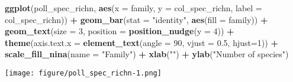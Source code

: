 \documentclass[]{article}
\newenvironment{Shaded}{\begin{snugshade}}{\end{snugshade}}
\newcommand{\DataTypeTok}[1]{\textcolor[rgb]{0.13,0.29,0.53}{#1}}
\newcommand{\DecValTok}[1]{\textcolor[rgb]{0.00,0.00,0.81}{#1}}
\newcommand{\FloatTok}[1]{\textcolor[rgb]{0.00,0.00,0.81}{#1}}
\newcommand{\KeywordTok}[1]{\textcolor[rgb]{0.13,0.29,0.53}{\textbf{#1}}}
\newcommand{\NormalTok}[1]{#1}
\newcommand{\OperatorTok}[1]{\textcolor[rgb]{0.81,0.36,0.00}{\textbf{#1}}}
\newcommand{\StringTok}[1]{\textcolor[rgb]{0.31,0.60,0.02}{#1}}
\begin{document}
\begin{Shaded}
\begin{Highlighting}[]
\KeywordTok{ggplot}\NormalTok{(poll_spec_richn, }\KeywordTok{aes}\NormalTok{(}\DataTypeTok{x =}\NormalTok{ family, }\DataTypeTok{y =}\NormalTok{ col_spec_richn, }\DataTypeTok{label =}\NormalTok{ col_spec_richn)) }\OperatorTok{+}
\StringTok{  }\KeywordTok{geom_bar}\NormalTok{(}\DataTypeTok{stat =} \StringTok{"identity"}\NormalTok{, }
           \KeywordTok{aes}\NormalTok{(}\DataTypeTok{fill =}\NormalTok{ family)) }\OperatorTok{+}\StringTok{ }
\StringTok{  }\KeywordTok{geom_text}\NormalTok{(}\DataTypeTok{size =} \DecValTok{3}\NormalTok{,}
            \DataTypeTok{position =} \KeywordTok{position_nudge}\NormalTok{(}\DataTypeTok{y =} \DecValTok{4}\NormalTok{)) }\OperatorTok{+}
\StringTok{  }\KeywordTok{theme}\NormalTok{(}\DataTypeTok{axis.text.x =} \KeywordTok{element_text}\NormalTok{(}\DataTypeTok{angle =} \DecValTok{90}\NormalTok{, }\DataTypeTok{vjust =} \FloatTok{0.5}\NormalTok{, }\DataTypeTok{hjust=}\DecValTok{1}\NormalTok{)) }\OperatorTok{+}
\StringTok{    }\KeywordTok{scale_fill_nina}\NormalTok{(}\DataTypeTok{name =} \StringTok{"Family"}\NormalTok{) }\OperatorTok{+}
\StringTok{  }\KeywordTok{xlab}\NormalTok{(}\StringTok{""}\NormalTok{) }\OperatorTok{+}
\StringTok{  }\KeywordTok{ylab}\NormalTok{(}\StringTok{"Number of species"}\NormalTok{)}
\end{Highlighting}
\end{Shaded}

\texttt{[image: figure/poll\_spec\_richn-1.png]}
\end{document}
